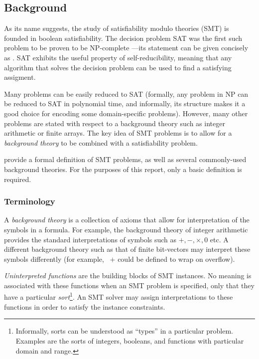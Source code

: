 \subsection{Background}

As its name suggests, the study of satisfiability modulo theories (SMT) is
founded in boolean satisfiability. The decision problem SAT was the first such
problem to be proven to be NP-complete \cite{cook_complexity_1971}---its
statement can be given concisely as . SAT exhibits the useful property of self-reducibility,
meaning that any algorithm that solves the decision problem can be used to find
a satisfying assigment.

Many problems can be easily reduced to SAT (formally, any problem in NP can be
reduced to SAT in polynomial time, and informally, its structure makes it a good
choice for encoding some domain-specific problems). However, many other problems
are stated with respect to a background theory such as integer arithmetic or
finite arrays. The key idea of SMT problems is to allow for a \emph{background
theory} to be combined with a satisfiability problem.

\textcite[ch. 12]{biere_handbook_2009} provide a formal definition of SMT
problems, as well as several commonly-used background theories. For the purposes
of this report, only a basic definition is required.

\subsubsection{Terminology}

A \emph{background theory} is a collection of axioms that allow for
interpretation of the symbols in a formula. For example, the background theory
of integer arithmetic provides the standard interpretations of symbols such as $
+, -, \times, 0 $ etc. A different background theory such as that of finite
bit-vectors may interpret these symbols differently (for example, \ $+$ could be
defined to wrap on overflow).

\emph{Uninterpreted functions} are the building blocks of SMT instances. No
meaning is associated with these functions when an SMT problem is specified,
only that they have a particular \emph{sort}\footnote{Informally, sorts can be
understood as ``types'' in a particular problem. Examples are the sorts of
integers, booleans, and functions with particular domain and range.}. An SMT
solver may assign interpretations to these functions in order to satisfy the
instance constraints.

